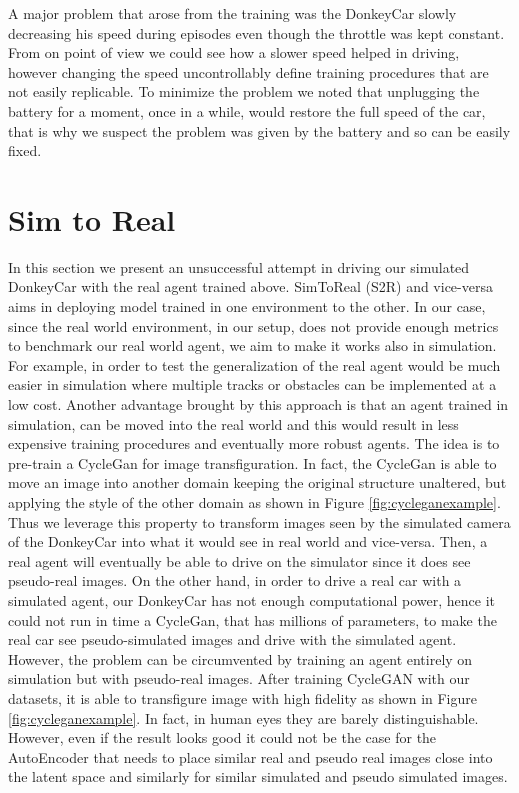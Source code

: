 A major problem that arose from the training was the DonkeyCar slowly decreasing his speed during episodes even though the throttle was kept constant. From on point of view we could see how a slower speed helped in driving, however changing the speed uncontrollably define training procedures that are not easily replicable. To minimize the problem we noted that unplugging the battery for a moment, once in a while, would restore the full speed of the car, that is why we suspect the problem was given by the battery and so can be easily fixed.

\section{Sim to Real}

In this section we present an unsuccessful attempt in driving our simulated DonkeyCar with the real agent trained above. SimToReal (S2R) and vice-versa aims in deploying model trained in one environment to the other. In our case, since the real world environment, in our setup, does not provide enough metrics to benchmark our real world agent, we aim to make it works also in simulation. For example, in order to test the generalization of the real agent would be much easier in simulation where multiple tracks or obstacles can be implemented at a low cost. Another advantage brought by this approach is that an agent trained in simulation, can be moved into the real world and this would result in less expensive training procedures and eventually more robust agents. The idea is to pre-train a CycleGan \citep{CycleGAN2017} for image transfiguration. In fact, the CycleGan is able to move an image into another domain keeping the original structure unaltered, but applying the style of the other domain as shown in Figure \ref{fig:cycleganexample}. Thus we leverage this property to transform images seen by the simulated camera of the DonkeyCar into what it would see in real world and vice-versa. Then, a real agent will eventually be able to drive on the simulator since it does see pseudo-real images. On the other hand, in order to drive a real car with a simulated agent, our DonkeyCar has not enough computational power, hence it could not run in time a CycleGan, that has millions of parameters, to make the real car see pseudo-simulated images and drive with the simulated agent. However, the problem can be circumvented by training an agent entirely on simulation but with pseudo-real images. After training CycleGAN with our datasets, it is able to transfigure image with high fidelity as shown in Figure \ref{fig:cycleganexample}. In fact, in human eyes they are barely distinguishable. However, even if the result looks good it could not be the case for the AutoEncoder that needs to place similar real and pseudo real images close into the latent space and similarly for similar simulated and pseudo simulated images.

